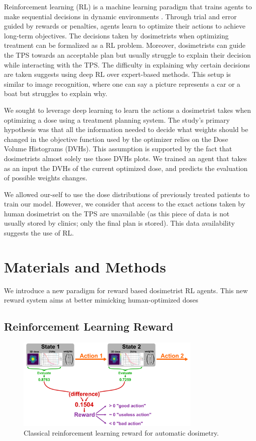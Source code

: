 Reinforcement learning (RL) is a machine learning paradigm that trains agents to make sequential decisions in dynamic environments \cite{brooks_what_2021}.
Through trial and error guided by rewards or penalties, agents learn to optimize their actions to achieve long-term objectives.
The decisions taken by dosimetrists when optimizing treatment can be formalized as a RL problem.
Moreover, dosimetrists can guide the TPS towards an acceptable plan but usually struggle to explain their decision while interacting with the TPS.
The difficulty in explaining why certain decisions are taken suggests using deep RL over expert-based methods.
This setup is similar to image recognition, where one can say a picture represents a car or a boat but struggles to explain why.

We sought to leverage deep learning to learn the actions a dosimetrist takes when optimizing a dose using a treatment planning system.
The study’s primary hypothesis was that all the information needed to decide what weights should be changed in the objective function used by the optimizer relies on the Dose Volume Histograms (DVHs).
This assumption is supported by the fact that dosimetrists almost solely use those DVHs plots.
We trained an agent that takes as an input the DVHs of the current optimized dose, and predicts the evaluation of possible weights changes.

We allowed our-self to use the dose distributions of previously treated patients to train our model.
However, we consider that access to the exact actions taken by human dosimetrist on the TPS are unavailable (as this piece of data is not usually stored by clinics; only the final plan is stored).
This data availability suggests the use of RL.

\section{Materials and Methods}
We introduce a new paradigm for reward based dosimetrist RL agents.
This new reward system aims at better mimicking human-optimized doses

\subsection{Reinforcement Learning Reward}

\begin{figure}
	\centering
	\includegraphics[width=0.8\textwidth]{reward.pdf}
	\caption{Classical reinforcement learning reward for automatic dosimetry.}
	\label{fig:reward_fig}
\end{figure}

